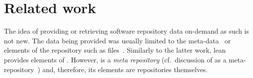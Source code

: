 
\section{Related work}
\label{sec:relwork}

The idea of providing or retrieving software repository data on-demand as such is not new. 
The data being provided was usually limited to the meta-data~\cite{Codebook} or elements 
of the repository such as files~\cite{Voinea2006Mining}. 
Similarly to the latter work, lean \ght provides elements of \gh.
However, \gh is a \emph{meta repository}  (cf.\ discussion of \ohloh as a meta-repository~\cite{Gruhn2013Security}) 
and, therefore, its elements are repositories themselves. 

